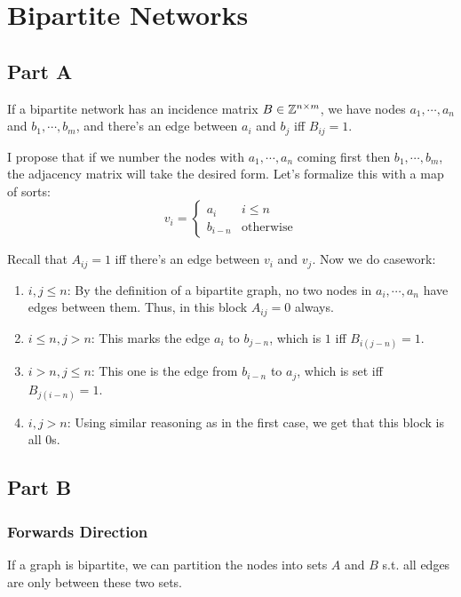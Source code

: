 \documentclass[12pt]{article}
\begin{document}
\section{Bipartite Networks}

\subsection{Part A}

If a bipartite network has an incidence matrix $B \in \mathbb{Z}^{n \times m}$,
we have nodes $a_1, \cdots, a_n$ and $b_1, \cdots, b_m$, and
there's an edge between $a_i$ and $b_j$ iff $B_{ij}=1$.

I propose that if we number the nodes with $a_1, \cdots, a_n$ coming first
then $b_1, \cdots, b_m$, the adjacency matrix will take the desired form.
Let's formalize this with a map of sorts:
\[v_i=\begin{cases}
            a_i     & i \le n          \\
            b_{i-n} & \text{otherwise}
      \end{cases}\]

Recall that $A_{ij}=1$ iff there's an edge between $v_i$ and $v_j$.
Now we do casework:
\begin{enumerate}[label=\arabic*.]
      \item $i, j \le n$: By the definition of a bipartite graph,
            no two nodes in $a_i, \cdots, a_n$ have edges between them.
            Thus, in this block $A_{ij}=0$ always.
      \item $i \le n, j > n$: This marks the edge $a_i$ to $b_{j-n}$, which is $1$ iff $B_{i(j-n)}=1$.
      \item $i > n, j \le n$: This one is the edge from $b_{i-n}$ to $a_j$, which is set iff $B_{j(i-n)}=1$.
      \item $i, j > n$: Using similar reasoning as in the first case, we get that this block is all $0$s.
\end{enumerate}

\subsection{Part B}

\subsubsection{Forwards Direction}

If a graph is bipartite, we can partition the nodes into sets $A$ and $B$
s.t. all edges are only between these two sets.
\end{document}
